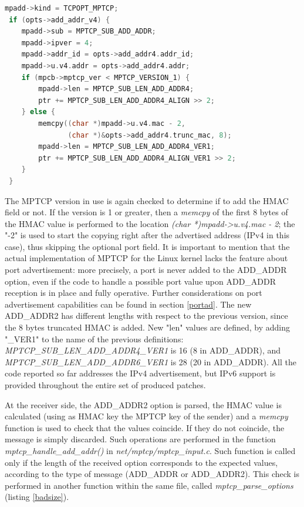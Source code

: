 \begin{lstlisting}[language=c, caption=\textit{Building ADD\_ADDR2 output message}, label=mpoutput]
 mpadd->kind = TCPOPT_MPTCP;
 if (opts->add_addr_v4) {
 	mpadd->sub = MPTCP_SUB_ADD_ADDR;
 	mpadd->ipver = 4;
 	mpadd->addr_id = opts->add_addr4.addr_id;
 	mpadd->u.v4.addr = opts->add_addr4.addr;
 	if (mpcb->mptcp_ver < MPTCP_VERSION_1) {
 		mpadd->len = MPTCP_SUB_LEN_ADD_ADDR4;
 		ptr += MPTCP_SUB_LEN_ADD_ADDR4_ALIGN >> 2;
 	} else {
 		memcpy((char *)mpadd->u.v4.mac - 2,
 		       (char *)&opts->add_addr4.trunc_mac, 8);
 		mpadd->len = MPTCP_SUB_LEN_ADD_ADDR4_VER1;
 		ptr += MPTCP_SUB_LEN_ADD_ADDR4_ALIGN_VER1 >> 2;
 	}
 }
\end{lstlisting}

The MPTCP version in use is again checked to determine if to add the HMAC field or not. If the version is 1 or greater, then a \textit{memcpy} of the first 8 bytes of the HMAC value is performed to the location \textit{(char *)mpadd->u.v4.mac - 2}; the "-2" is used to start the copying right after the advertised address (IPv4 in this case), thus skipping the optional port field. It is important to mention that the actual implementation of MPTCP for the Linux kernel lacks the feature about port advertisement: more precisely, a port is never added to the ADD\_ADDR option, even if the code to handle a possible port value upon ADD\_ADDR reception is in place and fully operative. Further considerations on port advertisement capabilities can be found in section \ref{portad}. The new ADD\_ADDR2 has different lengths with respect to the previous version, since the 8 bytes truncated HMAC is added. New "len" values are defined, by adding "\_VER1" to the name of the previous definitions: \textit{MPTCP\_SUB\_LEN\_ADD\_ADDR4\_VER1} is 16 (8 in ADD\_ADDR), and \textit{MPTCP\_SUB\_LEN\_ADD\_ADDR6\_VER1} is 28 (20 in ADD\_ADDR). All the code reported so far addresses the IPv4 advertisement, but IPv6 support is provided throughout the entire set of produced patches.


At the receiver side, the ADD\_ADDR2 option is parsed, the HMAC value is calculated (using as HMAC key the MPTCP key of the sender) and a \textit{memcpy} function is used to check that the values coincide. If they do not coincide, the message is simply discarded. Such operations are performed in the function \textit{mptcp\_handle\_add\_addr()} in \textit{net/mptcp/mptcp\_input.c}. Such function is called only if the length of the received option corresponds to the expected values, according to the type of message (ADD\_ADDR or ADD\_ADDR2). This check is performed in another function within the same file, called \textit{mptcp\_parse\_options} (listing \ref{badsize}).

